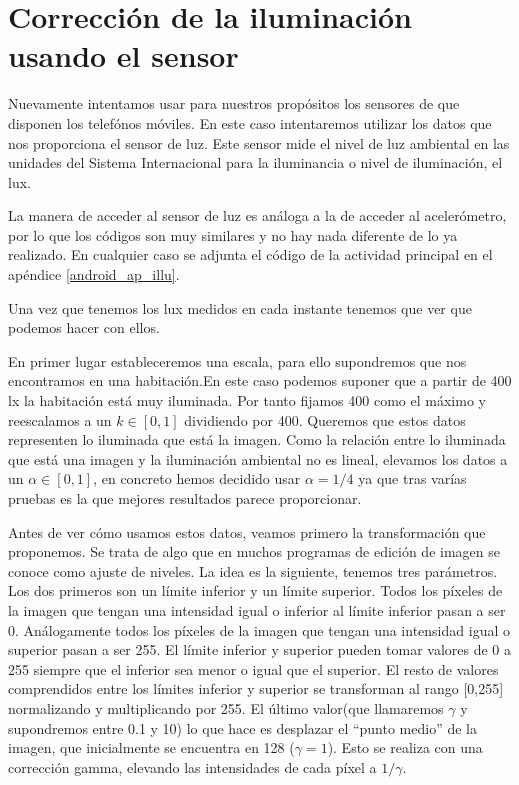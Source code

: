 \documentclass[a4paper,openright, 12pt]{book}
\begin{document}
\section{Corrección de la iluminación usando el sensor}
Nuevamente intentamos usar para nuestros propósitos los sensores de que disponen los telefónos móviles. En este caso intentaremos utilizar los datos que nos proporciona el sensor de luz. Este sensor mide el nivel de luz ambiental en las unidades del Sistema Internacional para la iluminancia o nivel de iluminación, el lux.

La manera de acceder al sensor de luz es análoga a la de acceder al acelerómetro, por lo que los códigos son muy similares y no hay nada diferente de lo ya realizado. En cualquier caso se adjunta el código de la actividad principal en el apéndice \ref{android_ap_illu}.

Una vez que tenemos los lux medidos en cada instante tenemos que ver que podemos hacer con ellos. 

En primer lugar estableceremos una escala, para ello supondremos que nos encontramos en una habitación.En este caso podemos suponer que a partir de 400 lx la habitación está muy iluminada. Por tanto fijamos 400 como el máximo y reescalamos a un  $k \in [0,1]$ dividiendo por 400. Queremos que estos datos representen lo iluminada que está la imagen. 
Como la relación entre lo iluminada que está una imagen y la iluminación ambiental no es lineal, elevamos los datos a un $\alpha  \in [0,1]$, en concreto hemos decidido usar  $\alpha = 1/4$ ya que tras varías pruebas es la que mejores resultados parece proporcionar.

Antes de ver cómo usamos estos datos, veamos primero la transformación que proponemos. Se trata de algo que en muchos programas de edición de imagen se conoce como ajuste de niveles. 
La idea es la siguiente, tenemos tres parámetros. Los dos primeros son un límite inferior y un límite superior.  Todos los píxeles de la imagen que tengan una intensidad igual o inferior al límite inferior pasan a ser 0. Análogamente todos los píxeles de la imagen que tengan una intensidad igual o superior pasan a ser 255. El límite inferior y superior pueden tomar valores de 0 a 255 siempre que el inferior sea menor o igual que el superior.
El resto de valores comprendidos entre los límites inferior y superior se transforman al rango [0,255] normalizando y multiplicando por 255.
El último valor(que llamaremos $\gamma$ y supondremos entre 0.1 y 10) lo que hace es desplazar el ``punto medio'' de la imagen, que inicialmente se encuentra en 128 ($\gamma=1$). Esto se realiza con una corrección gamma, elevando las intensidades de cada píxel a $1/\gamma$.
\end{document}
